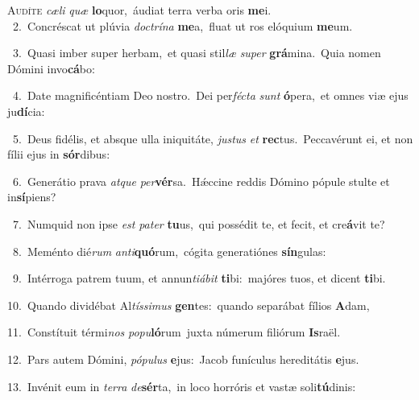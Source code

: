 \lettrine{\initial\textcolor{\initialcolor}{A}}{udíte} \textit{cæ}\-\textit{li} \textit{quæ} \textbf{lo}\-quor,~\star áudiat terra verba oris \textbf{me}\-i.\\
{\numbfont\textcolor{\numbcolor}{~2.}}~Concréscat ut plúvia \textit{doc}\-\textit{trí}\textit{na} \textbf{me}\-a,~\star fluat ut ros elóquium \textbf{me}\-um.\par
{\numbfont\textcolor{\numbcolor}{~3.}}~Quasi imber super herbam,~\dagger et quasi stil\textit{læ} \textit{su}\-\textit{per} \textbf{grá}\-mina.~\star Quia nomen Dómini invo\-\textbf{cá}\-bo:\par
{\numbfont\textcolor{\numbcolor}{~4.}}~Date magnificéntiam Deo nostro.~\dagger Dei per\-\textit{féc}\-\textit{ta} \textit{sunt} \textbf{ó}\-pera,~\star et omnes viæ ejus ju\-\textbf{dí}\-cia:\par
{\numbfont\textcolor{\numbcolor}{~5.}}~Deus fidélis, et absque ulla iniquitáte, \textit{jus}\-\textit{tus} \textit{et} \textbf{rec}\-tus.~\star Peccavérunt ei, et non fílii ejus in \textbf{sór}\-dibus:\par
{\numbfont\textcolor{\numbcolor}{~6.}}~Generátio prava \textit{at}\-\textit{que} \textit{per}\-\textbf{vér}sa.~\star Hǽccine reddis Dómino pópule stulte et in\-\textbf{sí}\-piens?\par
{\numbfont\textcolor{\numbcolor}{~7.}}~Numquid non ipse \textit{est} \textit{pa}\-\textit{ter} \textbf{tu}\-us,~\star qui possédit te, et fecit, et cre\-\textbf{á}\-vit te?\par
{\numbfont\textcolor{\numbcolor}{~8.}}~Meménto dié\textit{rum} \textit{an}\-\textit{ti}\textbf{quó}rum,~\star cógita generatiónes \textbf{sín}\-gulas:\par
{\numbfont\textcolor{\numbcolor}{~9.}}~Intérroga patrem tuum, et annun\-\textit{ti}\-\textit{á}\textit{bit} \textbf{ti}\-bi:~\star majóres tuos, et dicent \textbf{ti}\-bi.\par
{\numbfont\textcolor{\numbcolor}{10.}}~Quando dividébat Al\-\textit{tís}\-\textit{si}\textit{mus} \textbf{gen}\-tes:~\star quando separábat fílios \textbf{A}\-dam,\par
{\numbfont\textcolor{\numbcolor}{11.}}~Constítuit térmi\textit{nos} \textit{po}\-\textit{pu}\textbf{ló}rum~\star juxta númerum filiórum \textbf{Is}\-raël.\par
{\numbfont\textcolor{\numbcolor}{12.}}~Pars autem Dómini, \textit{pó}\-\textit{pu}\textit{lus} \textbf{e}\-jus:~\star Jacob funículus hereditátis \textbf{e}\-jus.\par
{\numbfont\textcolor{\numbcolor}{13.}}~Invénit eum in \textit{ter}\-\textit{ra} \textit{de}\-\textbf{sér}ta,~\star in loco horróris et vastæ soli\-\textbf{tú}\-dinis:\par
